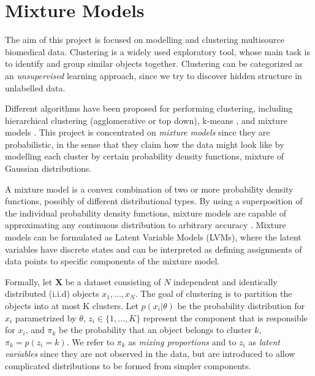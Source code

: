 \section{Mixture Models} \label{mixture-models-section}

The aim of this project is focused on modelling and clustering multisource biomedical data. Clustering is a widely used exploratory tool, whose main task is to identify and group similar objects together. Clustering can be categorized as an \emph{unsupervised} learning approach, since we try to discover hidden structure in unlabelled data.     

Different algorithms have been proposed for performing clustering, including hierarchical clustering (agglomerative or top down), k-means \citep{MacQueen1967}, and mixture models \citep{Titterington1985, McLachlan1988}. This project is concentrated on \emph{mixture models} since they are probabilistic, in the sense that they claim how the data might look like by modelling each cluster by certain probability density functions, \eg mixture of Gaussian distributions.  

A mixture model is a convex combination of two or more probability density functions, possibly of different distributional types. By using a superposition of the individual probability density functions, mixture models are capable of approximating any continuous distribution to arbitrary accuracy \citep{Marin2005}. Mixture models can be formulated as Latent Variable Models (LVMs), where the latent variables have discrete states and can be interpreted as defining assignments of data points to specific components of the mixture model.
 
Formally, let $\mathbf{X}$ be a dataset consisting of $N$ independent and identically distributed (i.i.d) objects $x_{1}, ..., x_{N}$. The goal of clustering is to partition the objects into at most K clusters. Let $p(x_{i}|\theta)$ be the probability distribution for $x_{i}$ parametrized by $\theta$, $z_{i} \in \lbrace 1,...,K \rbrace$ represent the component that is responsible for $x_{i}$, and $\pi_{k}$ be the probability that an object belongs to cluster $k$, \ie $\pi_{k} = p(z_{i} = k)$. We refer to $\pi_{k}$ as \emph{mixing proportions} and to $z_{i}$ as \emph{latent variables} since they are not observed in the data, but are introduced to allow complicated distributions to be formed from simpler components. 

